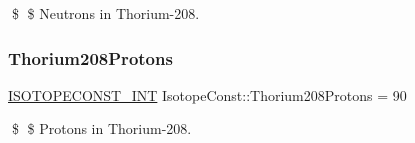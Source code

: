 \$ \$ Neutrons in Thorium-\/208. \mbox{\label{group___isotope_const-_thorium-_th208_ga7b283393fb5f565f012086535aec5e46}} 
\subsubsection{\texorpdfstring{Thorium208\+Protons}{Thorium208Protons}}
{\footnotesize\ttfamily \mbox{\hyperlink{group___isotope_const-_macros_ga5f18360b3e99483a35c32d789e62621c}{I\+S\+O\+T\+O\+P\+E\+C\+O\+N\+S\+T\+\_\+\+I\+NT}} Isotope\+Const\+::\+Thorium208\+Protons = 90}

\$ \$ Protons in Thorium-\/208. 